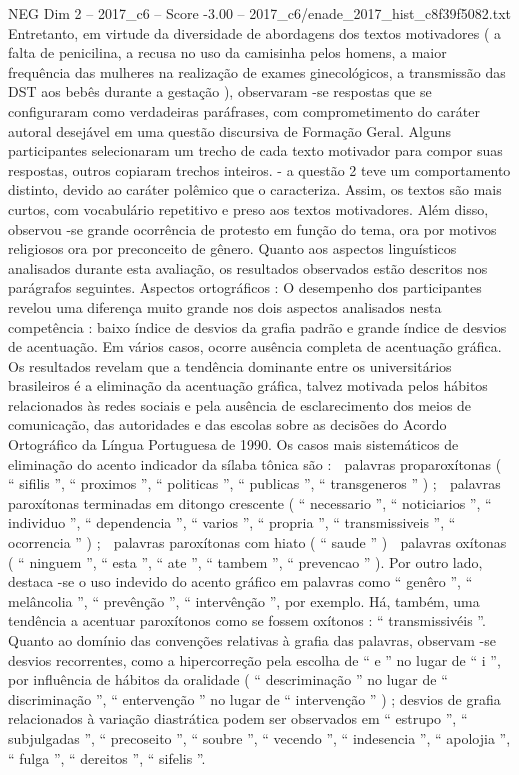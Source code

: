 \begin{textsample}{NEG Dim 2 – 2017\_c6 – Score -3.00 – 2017\_c6/enade\_2017\_hist\_c8f39f5082.txt}
Entretanto, em virtude da diversidade de abordagens dos textos motivadores ( a falta de penicilina, a recusa no uso da camisinha pelos homens, a maior frequência das mulheres na realização de exames ginecológicos, a transmissão das DST aos bebês durante a gestação ), observaram -se respostas que se configuraram como verdadeiras paráfrases, com comprometimento do caráter autoral desejável em uma questão discursiva de Formação Geral.
Alguns participantes selecionaram um trecho de cada texto motivador para compor suas respostas, outros copiaram trechos inteiros. - a questão 2 teve um comportamento distinto, devido ao caráter polêmico que o caracteriza.
Assim, os textos são mais curtos, com vocabulário repetitivo e preso aos textos motivadores.
Além disso, observou -se grande ocorrência de protesto em função do tema, ora por motivos religiosos ora por preconceito de gênero.
Quanto aos aspectos linguísticos analisados durante esta avaliação, os resultados observados estão descritos nos parágrafos seguintes.
Aspectos ortográficos : O desempenho dos participantes revelou uma diferença muito grande nos dois aspectos analisados nesta competência : baixo índice de desvios da grafia padrão e grande índice de desvios de acentuação.
Em vários casos, ocorre ausência completa de acentuação gráfica.
Os resultados revelam que a tendência dominante entre os universitários brasileiros é a eliminação da acentuação gráfica, talvez motivada pelos hábitos relacionados às redes sociais e pela ausência de esclarecimento dos meios de comunicação, das autoridades e das escolas sobre as decisões do Acordo Ortográfico da Língua Portuguesa de 1990.
Os casos mais sistemáticos de eliminação do acento indicador da sílaba tônica são :  palavras proparoxítonas ( “ sifilis ”, “ proximos ”, “ politicas ”, “ publicas ”, “ transgeneros ” ) ;  palavras paroxítonas terminadas em ditongo crescente ( “ necessario ”, “ noticiarios ”, “ individuo ”, “ dependencia ”, “ varios ”, “ propria ”, “ transmissiveis ”, “ ocorrencia ” ) ;  palavras paroxítonas com hiato ( “ saude ” )  palavras oxítonas ( “ ninguem ”, “ esta ”, “ ate ”, “ tambem ”, “ prevencao ” ).
Por outro lado, destaca -se o uso indevido do acento gráfico em palavras como “ genêro ”, “ melâncolia ”, “ prevênção ”, “ intervênção ”, por exemplo.
Há, também, uma tendência a acentuar paroxítonos como se fossem oxítonos : “ transmissivéis ”.
Quanto ao domínio das convenções relativas à grafia das palavras, observam -se desvios recorrentes, como a hipercorreção pela escolha de “ e ” no lugar de “ i ”, por influência de hábitos da oralidade ( “ descriminação ” no lugar de “ discriminação ”, “ entervenção ” no lugar de “ intervenção ” ) ; desvios de grafia relacionados à variação diastrática podem ser observados em “ estrupo ”, “ subjulgadas ”, “ precoseito ”, “ soubre ”, “ vecendo ”, “ indesencia ”, “ apolojia ”, “ fulga ”, “ dereitos ”, “ sifelis ”.

\end{textsample}
